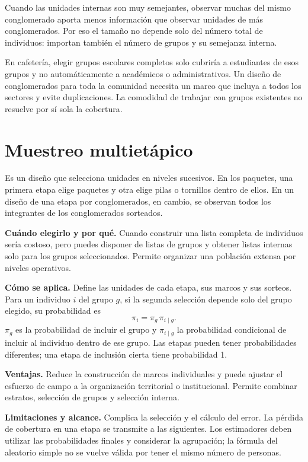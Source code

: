\documentclass[11pt,letterpaper]{article}
\begin{document}
Cuando las unidades internas son muy semejantes, observar muchas del mismo conglomerado aporta menos información que observar unidades de más conglomerados. Por eso el tamaño no depende solo del número total de individuos: importan también el número de grupos y su semejanza interna.

En cafetería, elegir grupos escolares completos solo cubriría a estudiantes de esos grupos y no automáticamente a académicos o administrativos. Un diseño de conglomerados para toda la comunidad necesita un marco que incluya a todos los sectores y evite duplicaciones. La comodidad de trabajar con grupos existentes no resuelve por sí sola la cobertura.
\clearpage
\section{Muestreo multietápico}
Es un diseño que selecciona unidades en niveles sucesivos. En los paquetes, una primera etapa elige paquetes y otra elige pilas o tornillos dentro de ellos. En un diseño de una etapa por conglomerados, en cambio, se observan todos los integrantes de los conglomerados sorteados.

\textbf{Cuándo elegirlo y por qué.} Cuando construir una lista completa de individuos sería costoso, pero puedes disponer de listas de grupos y obtener listas internas solo para los grupos seleccionados. Permite organizar una población extensa por niveles operativos.

\textbf{Cómo se aplica.} Define las unidades de cada etapa, sus marcos y sus sorteos. Para un individuo $i$ del grupo $g$, si la segunda selección depende solo del grupo elegido, su probabilidad es
\[
\pi_i=\pi_g\,\pi_{i\mid g}.
\]
$\pi_g$ es la probabilidad de incluir el grupo y $\pi_{i\mid g}$ la probabilidad condicional de incluir al individuo dentro de ese grupo. Las etapas pueden tener probabilidades diferentes; una etapa de inclusión cierta tiene probabilidad 1.

\textbf{Ventajas.} Reduce la construcción de marcos individuales y puede ajustar el esfuerzo de campo a la organización territorial o institucional. Permite combinar estratos, selección de grupos y selección interna.

\textbf{Limitaciones y alcance.} Complica la selección y el cálculo del error. La pérdida de cobertura en una etapa se transmite a las siguientes. Los estimadores deben utilizar las probabilidades finales y considerar la agrupación; la fórmula del aleatorio simple no se vuelve válida por tener el mismo número de personas.
\end{document}
